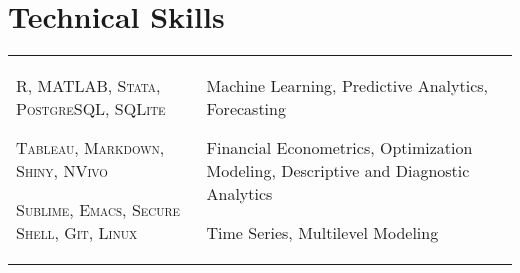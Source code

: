 \documentclass[a4paper,10pt]{article}
\begin{document}
\section{Technical Skills}
\begin{supertabular}{p{8.65cm} p{8.65cm}}

	\begin{enumerate*}[label =$\circ$, itemjoin={\newline}]
																\item \small \textsc{R, MATLAB, Stata, PostgreSQL, SQLite}
																\item \small \textsc{Tableau, Markdown, Shiny, NVivo}
																\item \small \textsc{Sublime, Emacs, Secure Shell, Git, Linux}
																\end{enumerate*}


	& \begin{enumerate*}[label =$\circ$, itemjoin={\newline}]
                                \item \small Machine Learning, Predictive Analytics, Forecasting
                                \item \small Financial Econometrics, Optimization Modeling, Descriptive and Diagnostic Analytics
                                \item \small Time Series, Multilevel Modeling \end{enumerate*}  \vspace{1mm} \\



\end{supertabular}



\smallskip
\end{document}
